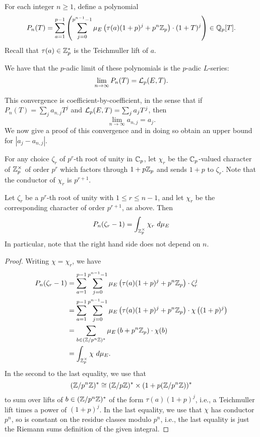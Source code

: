 For each integer $n\geq 1$, define a polynomial
$$
P_{n}(T) = 
   \sum_{a=1}^{p-1} \left( \sum_{j=0}^{p^{n-1}-1} \mu_{E}
      \left(\tau(a)(1+p)^j + p^n\mathbb{Z}_p\right) \cdot (1+T)^j \right) \in \mathbb{Q}_p[T].
$$
Recall that $\tau(a)\in\mathbb{Z}_p^*$ is the Teichmuller lift of $a$.
\begin{proposition}
We have that the $p$-adic limit of these polynomials is the $p$-adic
$L$-series:
$$
   \lim_{n\to\infty} P_n(T) = \mathcal{L}_p(E, T).
$$
\end{proposition}


This convergence is coefficient-by-coefficient, in the sense that
if
$P_{n}(T) = \sum_j a_{n,j} T^j$ and 
$\mathcal{L}_p(E,T) = \sum_j a_j T^j$, then
$$
\lim_{n \to \infty} a_{n,j} = a_j.
$$ 
We now give a proof of this convergence and in doing so obtain an
upper bound for $|a_j - a_{n,j}|$.



For any choice $\zeta_r$ of $p^r$-th root  
of unity in $\mathbb{C}_p$, 
let $\chi_r$ be the $\mathbb{C}_p$-valued 
character of $\mathbb{Z}_p^\times$ of order $p^r$ which
factors through $1+p\mathbb{Z}_p$ and sends $1+p$ to $\zeta_r$.
Note that the conductor of $\chi_r$ is $p^{r+1}$.

\begin{lemma}\label{lem:rval}
Let $\zeta_r$ be a $p^r$-th root of unity with
$1 \leq r \leq n-1$, and let $\chi_r$ be
the corresponding character of order $p^{r+1}$,
as above.  Then
$$
  P_{n}(\zeta_r-1) = \int_{\mathbb{Z}_p^\times} \chi_r ~d\mu_{E}
$$
In particular, note that the right hand side does not depend on $n$.
\end{lemma}
\begin{proof}
Writing $\chi=\chi_r$, we have
\begin{align*}
P_{n}(\zeta_r-1) 
&= \sum_{a=1}^{p-1} \sum_{j=0}^{p^{n-1}-1} \mu_{E}\left(\tau(a)(1+p)^j + p^n\mathbb{Z}_p\right) \cdot \zeta_r^j \\
&= \sum_{a=1}^{p-1} \sum_{j=0}^{p^{n-1}-1} \mu_{E}\left(\tau(a)(1+p)^j + p^n\mathbb{Z}_p\right) \cdot \chi\left((1+p)^j\right) \\
&= \sum_{ b \in (\mathbb{Z}/p^n\mathbb{Z})^*} \mu_{E}\left(b + p^n\mathbb{Z}_p\right) \cdot \chi(b) \\
&= \int_{\mathbb{Z}_p^\times} \chi ~d\mu_{E}.
\end{align*}
In the second to the last equality, we use that
$$(\mathbb{Z}/p^n\mathbb{Z})^* \cong (\mathbb{Z}/p\mathbb{Z})^* \times (1+p (\mathbb{Z}/p^n\mathbb{Z}))^*$$
to sum over lifts
of $b\in (\mathbb{Z}/p^n\mathbb{Z})^*$ of the form $\tau(a)(1+p)^j$, i.e., a Teichmuller lift times
a power of $(1+p)^j$.
In the last equality, we use that $\chi$ has conductor $p^n$,
so is constant on the residue classes modulo $p^n$, i.e.,
the last equality is just the Riemann sums definition of the 
given integral.

\end{proof}

